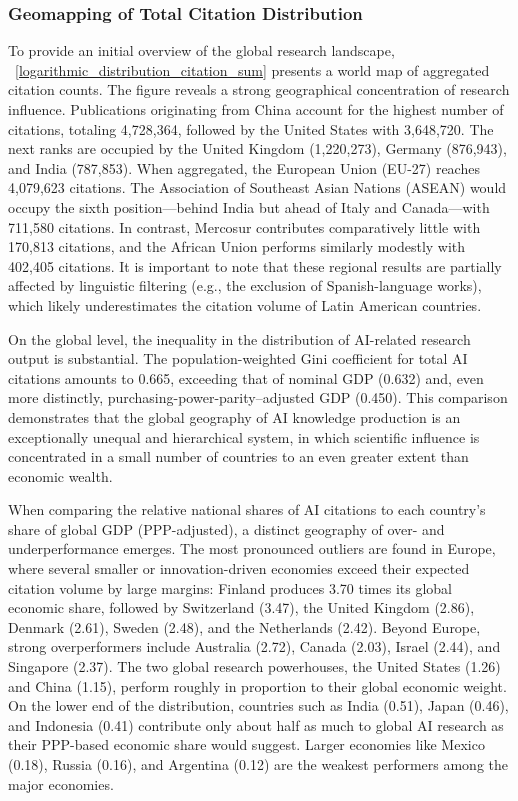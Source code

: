 \documentclass{article}
\begin{document}
\subsubsection{Geomapping of Total Citation Distribution}

To provide an initial overview of the global research landscape, \figurename~\ref{logarithmic_distribution_citation_sum} presents a world map of aggregated citation counts. The figure reveals a strong geographical concentration of research influence. Publications originating from China account for the highest number of citations, totaling 4,728,364, followed by the United States with 3,648,720. The next ranks are occupied by the United Kingdom (1,220,273), Germany (876,943), and India (787,853). When aggregated, the European Union (EU-27) reaches 4,079,623 citations. The Association of Southeast Asian Nations (ASEAN) would occupy the sixth position—behind India but ahead of Italy and Canada—with 711,580 citations. In contrast, Mercosur contributes comparatively little with 170,813 citations, and the African Union performs similarly modestly with 402,405 citations.
It is important to note that these regional results are partially affected by linguistic filtering (e.g., the exclusion of Spanish-language works), which likely underestimates the citation volume of Latin American countries.

On the global level, the inequality in the distribution of AI-related research output is substantial. The population-weighted Gini coefficient for total AI citations amounts to 0.665, exceeding that of nominal GDP (0.632) and, even more distinctly, purchasing-power-parity–adjusted GDP (0.450). This comparison demonstrates that the global geography of AI knowledge production is an exceptionally unequal and hierarchical system, in which scientific influence is concentrated in a small number of countries to an even greater extent than economic wealth.

When comparing the relative national shares of AI citations to each country’s share of global GDP (PPP-adjusted), a distinct geography of over- and underperformance emerges. The most pronounced outliers are found in Europe, where several smaller or innovation-driven economies exceed their expected citation volume by large margins: Finland produces 3.70 times its global economic share, followed by Switzerland (3.47), the United Kingdom (2.86), Denmark (2.61), Sweden (2.48), and the Netherlands (2.42). Beyond Europe, strong overperformers include Australia (2.72), Canada (2.03), Israel (2.44), and Singapore (2.37). The two global research powerhouses, the United States (1.26) and China (1.15), perform roughly in proportion to their global economic weight.
On the lower end of the distribution, countries such as India (0.51), Japan (0.46), and Indonesia (0.41) contribute only about half as much to global AI research as their PPP-based economic share would suggest. Larger economies like Mexico (0.18), Russia (0.16), and Argentina (0.12) are the weakest performers among the major economies.
\end{document}
